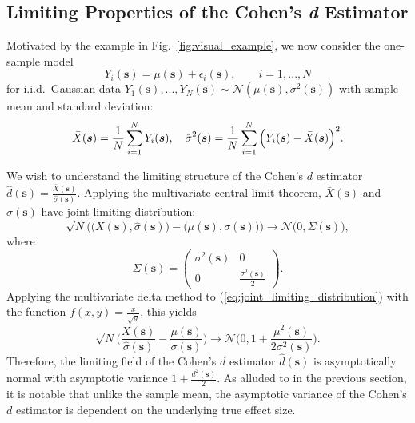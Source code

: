 \subsection{Limiting Properties of the Cohen's \textit{d} Estimator}
\label{sec:gauss_sig_plus_noise}
Motivated by the example in Fig.\ \ref{fig:visual_example}, we now consider the one-sample model
\begin{equation}
\label{eq:sig_plus_noise}
Y_{i}(\bm{s}) = \mu(\bm{s}) + \epsilon_{i}(\bm{s}), \qquad i = 1, ..., N
\end{equation}
for i.i.d.\ Gaussian data $Y_{1}(\bm{s}), ..., Y_{N}(\bm{s}) \sim \mathcal{N}(\mu(\bm{s}),\sigma^{2}(\bm{s}))$ with sample mean and standard deviation:
\begin{equation}
\label{eq:unbiased_estimators}
\bar{X}(\bm{s}) = \frac{1}{N}\sum_{i=1}^{N} Y_{i}(\bm{s}), \hspace{10pt} \operatorname{\hat{\sigma}}^{2}(\bm{s}) = \frac{1}{N}\sum_{i=1}^{N} \Big(Y_{i}(\bm{s}) - \bar{X}(\bm{s})\Big)^{2}.    
\end{equation}

We wish to understand the limiting structure of the Cohen's $d$ estimator $\hat{d}(\bm{s}) = \frac{\bar{X}(\bm{s})}{\hat{\sigma}(\bm{s})}$. Applying the multivariate central limit theorem, $\bar{X}(\bm{s})$ and $\hat{\sigma}(\bm{s})$ have joint limiting distribution: 
\begin{equation}
\label{eq:joint_limiting_distribution}
\sqrt{N}\Big(\Big(\bar{X}(\bm{s}), \hat{\sigma}(\bm{s})\Big) - \Big(\mu(\bm{s}),\sigma(\bm{s})\Big)\Big) \rightarrow \mathcal{N}\Big(0, \Sigma(\bm{s}) \Big),
\end{equation}
where
\begin{equation}
\label{eq:covariance_matrix}
\Sigma(\bm{s}) = \begin{pmatrix}
			\sigma^{2}(\bm{s}) & 0 \\
            0 & \frac{\sigma^{2}(\bm{s})}{2} 
         \end{pmatrix}.
\end{equation}
Applying the multivariate delta method to (\ref{eq:joint_limiting_distribution}) with the function $f(x,y) = \frac{x}{\sqrt{y}}$, this yields
\begin{equation}
\label{eq:cohen_limiting_distribution}
\sqrt{N}\Bigg( \frac{\bar{X}(\bm{s})}{\hat{\sigma}(\bm{s})} - \frac{\mu(\bm{s})}{\sigma(\bm{s})} \Bigg) \rightarrow \mathcal{N}\Bigg(0, 1 + \frac{\mu^{2}(\bm{s})}{2\sigma^{2}(\bm{s})} \Bigg).
\end{equation}
Therefore, the limiting field of the Cohen's $d$ estimator $\hat{d}(\bm{s})$ is asymptotically normal with asymptotic variance $1 + \frac{d^{2}(\bm{s})}{2}$. As alluded to in the previous section, it is notable that unlike the sample mean, the asymptotic variance of the Cohen's $d$ estimator is dependent on the underlying true effect size.

